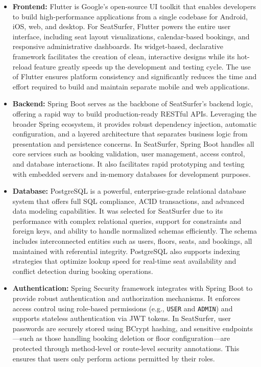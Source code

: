 \documentclass[12pt,a4paper]{report} %
\begin{document}
\begin{itemize}
    \item \textbf{Frontend:} Flutter is Google's open-source UI toolkit that enables developers to build high-performance applications from a single codebase for Android, iOS, web, and desktop. For SeatSurfer, Flutter powers the entire user interface, including seat layout visualizations, calendar-based bookings, and responsive administrative dashboards. Its widget-based, declarative framework facilitates the creation of clean, interactive designs while its hot-reload feature greatly speeds up the development and testing cycle. The use of Flutter ensures platform consistency and significantly reduces the time and effort required to build and maintain separate mobile and web applications.

    \item \textbf{Backend:} Spring Boot serves as the backbone of SeatSurfer's backend logic, offering a rapid way to build production-ready RESTful APIs. Leveraging the broader Spring ecosystem, it provides robust dependency injection, automatic configuration, and a layered architecture that separates business logic from presentation and persistence concerns. In SeatSurfer, Spring Boot handles all core services such as booking validation, user management, access control, and database interactions. It also facilitates rapid prototyping and testing with embedded servers and in-memory databases for development purposes.

    \item \textbf{Database:} PostgreSQL is a powerful, enterprise-grade relational database system that offers full SQL compliance, ACID transactions, and advanced data modeling capabilities. It was selected for SeatSurfer due to its performance with complex relational queries, support for constraints and foreign keys, and ability to handle normalized schemas efficiently. The schema includes interconnected entities such as users, floors, seats, and bookings, all maintained with referential integrity. PostgreSQL also supports indexing strategies that optimize lookup speed for real-time seat availability and conflict detection during booking operations.

    \item \textbf{Authentication:} Spring Security framework integrates with Spring Boot to provide robust authentication and authorization mechanisms. It enforces access control using role-based permissions (e.g., \texttt{USER} and \texttt{ADMIN}) and supports stateless authentication via JWT tokens. In SeatSurfer, user passwords are securely stored using BCrypt hashing, and sensitive endpoints—such as those handling booking deletion or floor configuration—are protected through method-level or route-level security annotations. This ensures that users only perform actions permitted by their roles.


\end{itemize}
\end{document}
